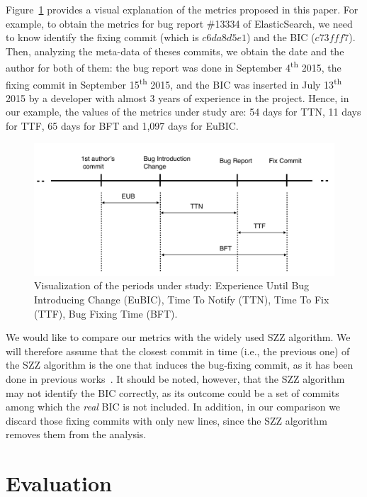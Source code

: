 \documentclass[10pt, conference]{IEEEtran}
\begin{document}
Figure~\ref{fig:metrics} provides a visual explanation of the metrics proposed in this paper. For example, to obtain the metrics for bug report \#13334 of ElasticSearch, we need to know identify the fixing commit (which is $c6da8d5e1$) and the BIC ($c73fff7$). Then, analyzing the meta-data of theses commits, we obtain the date and the author for both of them: the bug report was done in September 4\textsuperscript{th} 2015, the fixing commit in  September 15\textsuperscript{th} 2015, and the BIC was inserted in July 13\textsuperscript{th}  2015 by a developer with almost 3 years of experience in the project. Hence, in our example, the values of the metrics under study are: 54 days for TTN, 11 days for TTF, 65 days for BFT and 1,097 days for EuBIC.
\begin{figure}[ht]
\centering
\includegraphics[width=\columnwidth]{metrics.png}
\caption{Visualization of the periods under study: Experience Until Bug Introducing Change (EuBIC),  Time To Notify (TTN), Time To Fix (TTF), Bug Fixing Time (BFT).}
\label{fig:metrics}       %
\end{figure}

We would like to compare our metrics with the widely used SZZ algorithm. We will therefore assume that the closest commit in time (i.e., the previous one) of the SZZ algorithm is the one that induces the bug-fixing commit, as it has been done in previous works~\cite{eyolfson2011time}. It should be noted, however, that the SZZ algorithm may not identify the BIC correctly, as its outcome could be a set of commits among which the \emph{real} BIC is not included. In addition, in our comparison we discard those fixing commits with only new lines, since the SZZ algorithm removes them from the analysis.


\section{Evaluation}
\label{sec:evaluation}
\end{document}
